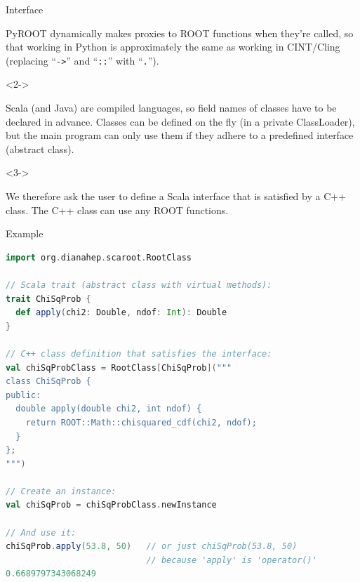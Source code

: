 \documentclass{beamer}
\begin{document}
\begin{frame}{Interface}

\begin{block}{}
\vspace{-\baselineskip}
PyROOT dynamically makes proxies to ROOT functions when they're called, so that working in Python is approximately the same as working in CINT/Cling (replacing ``{\tt ->}'' and ``{\tt ::}'' with ``{\tt .}'').
\end{block}

\vfill
\begin{uncoverenv}<2->
\begin{block}{}
\vspace{-\baselineskip}
Scala (and Java) are compiled languages, so field names of classes have to be declared in advance. Classes can be defined on the fly (in a private ClassLoader), but the main program can only use them if they adhere to a predefined interface (abstract class).
\end{block}
\end{uncoverenv}

\vfill
\begin{uncoverenv}<3->
\begin{block}{}
\vspace{-\baselineskip}
We therefore ask the user to define a Scala interface that is satisfied by a C++ class. The C++ class can use any ROOT functions.
\end{block}
\end{uncoverenv}
\end{frame}

\begin{frame}[fragile]{Example}
\begin{lstlisting}[language=scala]
import org.dianahep.scaroot.RootClass

// Scala trait (abstract class with virtual methods):
trait ChiSqProb {
  def apply(chi2: Double, ndof: Int): Double
}

// C++ class definition that satisfies the interface:
val chiSqProbClass = RootClass[ChiSqProb]("""
class ChiSqProb {
public:
  double apply(double chi2, int ndof) {
    return ROOT::Math::chisquared_cdf(chi2, ndof);
  }
};
""")

// Create an instance:
val chiSqProb = chiSqProbClass.newInstance

// And use it:
chiSqProb.apply(53.8, 50)   // or just chiSqProb(53.8, 50)
                            // because 'apply' is 'operator()'
0.6689797343068249
\end{lstlisting}
\end{frame}
\end{document}
